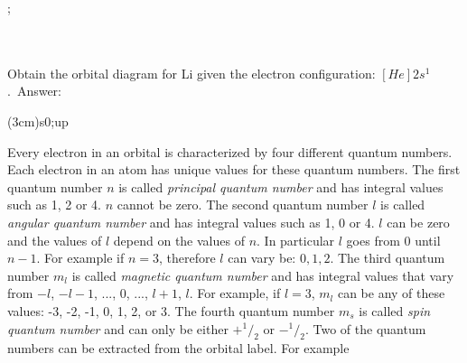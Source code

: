 \documentclass[main.tex]{subfiles}
\begin{document}
\begin{description}
\begin{example}
\begin{MOdiagram}[style=round,AO-width
=15pt, distance=1.5cm,lines={none},names-style={anchor=left, draw=blue}]
;
 \end{MOdiagram}
\\
\faDiamond\ \\
Obtain the orbital diagram for Li given the electron configuration: $[He] 2s^1$.\
\flushright Answer: \begin{MOdiagram}[style=round,AO-width
=15pt, distance=1.5cm,lines={none},names-style={anchor=left, draw=blue}]
 \AO(3cm){s}{0;up}
 \end{MOdiagram}
\end{example}
\begin{marginfigure}
\end{marginfigure}%

 \item[\docfilehook{Quantum numbers}{Quantum numbers}] Every electron in an orbital is characterized by four different quantum numbers. Each electron in an atom has unique values for these quantum numbers. The first quantum number $n$ is called \emph{principal quantum number} and has integral values such as 1, 2 or 4. $n$ cannot be zero. The second quantum number $l$ is called \emph{angular quantum number} and has integral values such as 1, 0 or 4. $l$ can be zero and the values of $l$ depend on the values of $n$. In particular $l$ goes from $0$ until $n-1$. For example if $n=3$, therefore $l$ can vary be: $0, 1, 2$. The third quantum number $m_l$ is called \emph{magnetic quantum number} and has integral values that vary from  $-l$, $-l-1$, ..., 0, ..., $l+1$, $l$. For example, if $l=3$, $m_l$ can be any of these values: -3, -2, -1, 0, 1, 2, or 3. The fourth quantum number $m_s$ is called \emph{spin quantum number} and can only be either $+^1/_2$ or $-^1/_2$. Two of the quantum numbers can be extracted from the orbital label. For example
\end{description}
\end{document}
